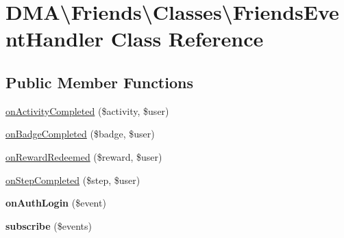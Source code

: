 \hypertarget{classDMA_1_1Friends_1_1Classes_1_1FriendsEventHandler}{\section{D\-M\-A\textbackslash{}Friends\textbackslash{}Classes\textbackslash{}Friends\-Event\-Handler Class Reference}
\label{classDMA_1_1Friends_1_1Classes_1_1FriendsEventHandler}
}
\subsection*{Public Member Functions}
\begin{DoxyCompactItemize}
\item 
\hyperlink{classDMA_1_1Friends_1_1Classes_1_1FriendsEventHandler_a6467365017b9d494122c8ded41a9a406}{on\-Activity\-Completed} (\$activity, \$user)
\item 
\hyperlink{classDMA_1_1Friends_1_1Classes_1_1FriendsEventHandler_aa13c2568369d06c2a0ca1c96f099ff09}{on\-Badge\-Completed} (\$badge, \$user)
\item 
\hyperlink{classDMA_1_1Friends_1_1Classes_1_1FriendsEventHandler_aeb8499a09334c87311a7f5840c43685a}{on\-Reward\-Redeemed} (\$reward, \$user)
\item 
\hyperlink{classDMA_1_1Friends_1_1Classes_1_1FriendsEventHandler_a3a99cae5eaa37efa395ef4fe8eb30c11}{on\-Step\-Completed} (\$step, \$user)
\item 
\hypertarget{classDMA_1_1Friends_1_1Classes_1_1FriendsEventHandler_a480d5807466962402ccc13260cfb0930}{{\bfseries on\-Auth\-Login} (\$event)}\label{classDMA_1_1Friends_1_1Classes_1_1FriendsEventHandler_a480d5807466962402ccc13260cfb0930}

\item 
\hypertarget{classDMA_1_1Friends_1_1Classes_1_1FriendsEventHandler_a92cad97622be6dd1ed477dcc05d81074}{{\bfseries subscribe} (\$events)}\label{classDMA_1_1Friends_1_1Classes_1_1FriendsEventHandler_a92cad97622be6dd1ed477dcc05d81074}

\end{DoxyCompactItemize}


